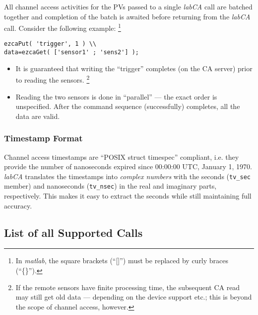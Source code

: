 \documentclass{article}
\newcommand{\sca}{{\em labCA}}
\newcommand{\matlab}{{\em matlab}}
\begin{document}
All channel access activities for the PVs
passed to a single \sca{} call are batched together and
completion of the batch is awaited before returning from
the \sca{} call. Consider the following example:%
\footnote{
In \matlab{}, the square brackets (``[]'') must be replaced
by curly braces (``\{\}'').}
\begin{verbatim}
ezcaPut( 'trigger', 1 ) \\
data=ezcaGet( ['sensor1' ; 'sens2'] );
\end{verbatim}
\begin{itemize}
%
\item It is guaranteed that writing the ``trigger''
completes (on the CA server) prior to reading the
sensors.%
\footnote{If the remote sensors have finite
processing time, the subsequent CA read may still
get old data --- depending on the device support
etc.; this is beyond the scope of channel access, however.}
%
\item Reading the two sensors is done in ``parallel'' ---
the exact order is unspecified. After the command sequence
(successfully) completes, all the data are valid.
\end{itemize}

\subsubsection{Timestamp Format}
\label{tsformat}
Channel access timestamps are ``POSIX struct timespec''
compliant, i.e. they provide the number of nanoseconds
expired since 00:00:00 UTC, January 1, 1970. \sca{} 
translates the timestamps into {\em complex numbers}
with the seconds ({\tt tv\_sec} member) and nanoseconds
({\tt tv\_nsec}) in the real and imaginary parts, respectively.
This makes it easy to extract the seconds while still maintaining
full accuracy.

\subsection{List of all Supported Calls}
\end{document}
